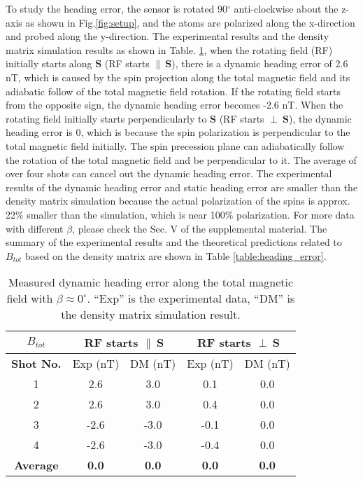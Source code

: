 \documentclass[prx,twocolumn,10pt,nofootinbib]{revtex4-1}
\begin{document}
To study the heading error, the sensor is rotated 90$^{\circ}$ anti-clockwise about the z-axis as shown in Fig.\ref{fig:setup}, and the atoms are polarized along the x-direction and probed along the y-direction. The experimental results and the density matrix simulation results as shown in Table. \ref{table:bz_HE}, when the rotating field (RF) initially starts along $\bm{S}$ (RF starts $\parallel~\bm{S}$), there is a dynamic heading error of 2.6 nT, which is caused by the spin projection along the total magnetic field and its adiabatic follow of the total magnetic field rotation. If the rotating field starts from the opposite sign, the dynamic heading error becomes -2.6 nT. When the rotating field initially starts perpendicularly to $\bm{S}$ (RF starts $\perp~\bm{S}$), the dynamic heading error is 0, which is because the spin polarization is perpendicular to the total magnetic field initially. The spin precession plane can adiabatically follow the rotation of the total magnetic field and be perpendicular to it. The average of over four shots can cancel out the dynamic heading error. The experimental results of the dynamic heading error and static heading error are smaller than the density matrix simulation because the actual polarization of the spins is approx. 22\% smaller than the simulation, which is near 100\% polarization. For more data with different $\beta$, please check the Sec. V of the supplemental material. The summary of the experimental results and the theoretical predictions related to $B_{tot}$ based on the density matrix are shown in Table \ref{table:heading_error}.

\begin{table}
\centering
\begin{tabular}{|c|c|c|c|c|}
\hline
\multicolumn{1}{|c|}{$B_{tot}$} & \multicolumn{2}{c|}{RF starts $\parallel~\bm{S}$} & \multicolumn{2}{c|}{RF starts $\perp~\bm{S}$} \\ \hline
\textbf{Shot No.} & Exp (nT) & DM (nT) & Exp (nT) & DM (nT) \\ \hline
1 & 2.6 & 3.0 & 0.1 & 0.0 \\ \hline
2 & 2.6 & 3.0 & 0.4 & 0.0 \\ \hline
3 & -2.6 & -3.0 & -0.1 & 0.0 \\ \hline
4 & -2.6 & -3.0 & -0.4 & 0.0 \\ \hline
\textbf{Average} & \textbf{0.0} & \textbf{0.0} & \textbf{0.0} & \textbf{0.0} \\ \hline
\end{tabular}
\caption{Measured dynamic heading error along the total magnetic field with $\beta \approx 0 ^{\circ}$. ``Exp'' is the experimental data, ``DM'' is the density matrix simulation result.}
\label{table:bz_HE}
\end{table}
\end{document}

